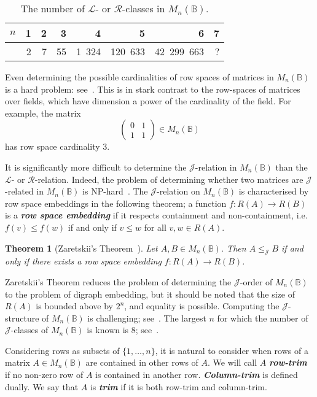\documentclass[11pt]{article}
\newtheorem{thm}{Theorem}[subsection]
\newcommand{\defn}[1]{\textbf{\textit{#1}}}
\numberwithin{equation}{section}
\renewcommand{\to}{\longrightarrow}
\newcommand{\B}{\mathbb{B}}
\newcommand{\Bn}{M_n(\B)}
\renewcommand{\L}{\mathscr{L}}
\newcommand{\R}{\mathscr{R}}
\newcommand{\J}{\mathscr{J}}
\newcommand{\mat}[4]{\begin{pmatrix}#1&#2\\#3&#4\end{pmatrix}}
\begin{document}
\begin{table}
  \centering
  \begin{tabular}{r|r|r|r|r|r|r|r}
    $n$ & 1 & 2 & 3 & 4 & 5 & 6 & 7 \\
    \hline
     & 2 & 7 & 55 & 1\ 324& 120\ 633& 42\ 299\ 663& ?  
  \end{tabular}
\vspace{1cm}

\caption{The number of $\L$- or $\R$-classes in $\Bn$.} 
  \label{tab:NumberLRClasses}
\end{table}

Even determining the possible cardinalities of row spaces of matrices in $\Bn$
is a hard problem: see~\cite{Breen2001aa, Konieczny1992aa, Li1995aa,
  Shaofang1998aa, Zivkovic2006aa}. This is in stark contrast to the row-spaces
of matrices over fields, which have dimension a power of the cardinality of the
field. For example, the matrix \[\mat{0}{1}{1}{1} \in \Bn\] has row space
cardinality $3$.

It is significantly more difficult to determine the $\J$-relation in $\Bn$ than
the $\L$- or $\R$-relation. Indeed, the problem of determining whether two
matrices are $\J$-related in $\Bn$ is NP-hard~\cite[Theorem 2.7]{Fenner2018aa}.
The $\J$-relation on $\Bn$ is characterised by row space embeddings in the
following theorem; a function $f: R(A) \to R(B)$ is a \defn{row space embedding}
if it respects containment and non-containment, i.e.\ $f(v) \leq f(w)$ if and
only if $v \leq w$ for all $v, w
\in R(A)$.
\begin{thm}[Zaretskii's Theorem~\cite{Zaretskii1963aa}]
  Let $A, B \in \Bn$. Then $A \leq_{\J} B$ if and only if there exists a row
  space embedding $f: R(A) \to R(B)$.
\end{thm}
Zaretskii's Theorem reduces the problem of determining the $\J$-order of $\Bn$ to the
problem of digraph embedding, but it should be noted that the size of $R(A)$ is
bounded above by $2^n$, and equality is possible. Computing the $\J$-structure of
$\Bn$ is challenging; see~\cite{Breen1997aa}. The largest $n$ for which the
number of $\J$-classes of $\Bn$ is known is $8$; see~\cite{Breen2001aa}.

Considering rows as subsets of $\{1, \ldots, n\}$, it is natural to consider
when rows of a matrix $A \in \Bn$ are contained in other rows of $A$. We will
call $A$ \defn{row-trim} if no non-zero row of $A$ is contained in another row.
\defn{Column-trim} is defined dually. We say that $A$ is \defn{trim} if it is
both row-trim and column-trim.
\end{document}
